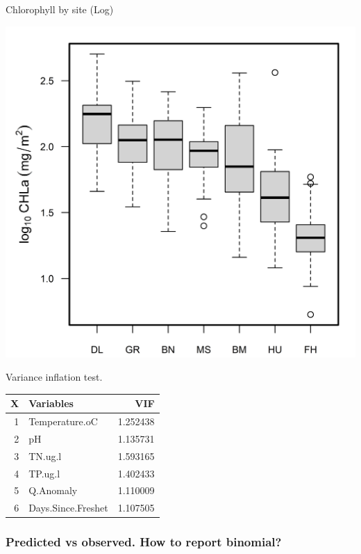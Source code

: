 \documentclass[
]{article}
\let\origfigure\figure
\let\endorigfigure\endfigure
\renewenvironment{figure}[1][2] {
    \expandafter\origfigure\expandafter[H]
} {
    \endorigfigure
}
\begin{document}
Chlorophyll by site (Log)

\begin{figure}

{\centering \includegraphics[width=1\linewidth]{Manuscript_files/FIGURES/Chla_Boxplots} 

}

\caption{A caption}\label{fig:unnamed-chunk-1}
\end{figure}

Variance inflation test.

\begin{longtable}[]{@{}rlr@{}}
\toprule()
X & Variables & VIF \\
\midrule()
\endhead
1 & Temperature.oC & 1.252438 \\
2 & pH & 1.135731 \\
3 & TN.ug.l & 1.593165 \\
4 & TP.ug.l & 1.402433 \\
5 & Q.Anomaly & 1.110009 \\
6 & Days.Since.Freshet & 1.107505 \\
\bottomrule()
\end{longtable}

\hypertarget{predicted-vs-observed.-how-to-report-binomial}{%
\subsubsection{Predicted vs observed. How to report
binomial?}\label{predicted-vs-observed.-how-to-report-binomial}}
\end{document}
